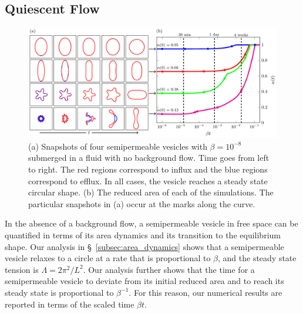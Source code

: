 \documentclass[prb,preprint,showpacs,preprintnumbers,amsmath,amssymb,longbibliography]{revtex4-1}
\newif\ifTikz
\begin{document}
\subsection{Quiescent Flow} 
\begin{figure}[htp]
  \centering
  \ifTikz
  
  \else
  \includegraphics{figures/relaxationComposite.pdf}
  \fi
  \caption{\label{fig:relaxationComposite} (a) Snapshots of four
  semipermeable vesicles with $\beta = 10^{-8}$ submerged in a fluid
  with no background flow. Time goes from left to right. The red regions
  correspond to influx and the blue regions correspond to efflux. In all
  cases, the vesicle reaches a steady state circular shape. (b) The
  reduced area of each of the simulations. The particular snapshots in
  (a) occur at the marks along the curve.}
\end{figure}
In the absence of a background flow, a semipermeable vesicle in free
space can be quantified in terms of its area dynamics and its transition
to the equilibrium shape. Our analysis in \S~\ref{subsec:area_dynamics} shows
that a semipermeable vesicle relaxes to a circle at a rate that is
proportional to $\beta$, and the steady state tension is $\Lambda =
2\pi^2/L^2$. Our analysis further shows that the time for a
semipermeable vesicle to deviate from its initial reduced area and to
reach its steady state is proportional to $\beta^{-1}$. For this reason,
our numerical results are reported in terms of the scaled time $\beta
t$.
\end{document}

